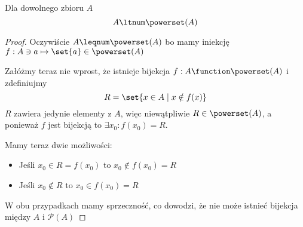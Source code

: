 \begin{theorem}[Cantor]
    Dla dowolnego zbioru \( A \)
    \[
        A \ltnum \powerset(A)
    \]
\end{theorem}
\begin{proof}
    Oczywiście \( A \leqnum \powerset(A) \) bo mamy iniekcję \( f: A \ni a \mapsto \set{a} \in \powerset(A) \)
    
    Załóżmy teraz nie wprost, że istnieje bijekcja \( f: A \function \powerset(A) \) i zdefiniujmy
    \[
        R = \set{ x \in A \mid x \notin f(x) }
    \]
    \( R \) zawiera jedynie elementy z \( A \), więc niewątpliwie \( R \in \powerset(A) \), a ponieważ \( f \) jest bijekcją to \( \exists x_0 : f(x_0) = R \).
    
    Mamy teraz dwie możliwości:
    \begin{itemize}
        \item Jeśli \( x_0 \in R = f(x_0) \) to \( x_0 \notin f(x_0) = R \)
        \item Jeśli \( x_0 \notin R \) to \( x_0 \in f(x_0) = R \)
    \end{itemize}
    W obu przypadkach mamy sprzeczność, co dowodzi, że nie może istnieć bijekcja między \( A \) i \( \mathcal{P}(A) \)
\end{proof}